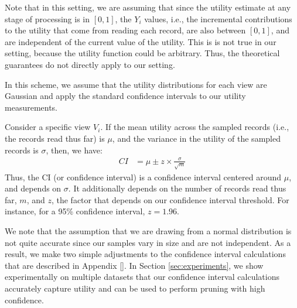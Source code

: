 Note that in this setting, we are assuming that since the
utility estimate at any stage of processing is in $[0, 1]$, 
the $Y_i$ values, i.e., the incremental contributions to the utility
that come from reading each record, are also between $[0, 1]$,
and are independent of the current value of the utility. 
This is is not true in our setting, 
because the utility function could be arbitrary.
Thus, the theoretical guarantees do not directly apply to our setting. 

 In this scheme, we assume that the utility
distributions for each view are Gaussian and apply the standard confidence
intervals to our utility measurements.

Consider a specific view $V_i$. 
If the mean utility across the sampled records 
(i.e., the records read thus far) is $\mu$,
and the variance in the utility of the sampled records
is $\sigma$, then, we have:
\begin{align}
CI & = \mu \pm z \times \frac{\sigma}{\sqrt{m}}
\end{align}
Thus, the CI (or confidence interval) is 
a confidence interval centered around $\mu$, 
and depends on $\sigma$. 
It additionally depends on the number of records
read thus far, $m$,
and $z$, the factor that depends on our confidence interval threshold.
For instance, for a 95\% confidence interval, $z = 1.96$.

We note that the assumption that we are drawing from a normal distribution is
not quite accurate since our samples vary in size and are not independent.
As a result, we make two simple adjustments to the confidence interval
calculations that are described in Appendix \ref{}.
In Section \ref{sec:experiments}, we show experimentally on multiple datasets
that our confidence interval calculations accurately capture utility and can be used to
perform pruning with high confidence.







